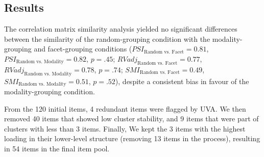 \documentclass[
  man,
  floatsintext,
  longtable,
  nolmodern,
  notxfonts,
  notimes,
  mask,
  colorlinks=true,linkcolor=blue,citecolor=blue,urlcolor=blue]{apa7}
\begin{document}
\subsection{Results}\label{results}

The correlation matrix similarity analysis yielded no significant
differences between the similarity of the random-grouping condition with
the modality-grouping and facet-grouping conditions
(\(PSI_{\text{Random vs. Facet}} = 0.81\),
\(PSI_{\text{Random vs. Modality}} = 0.82\), \(p = .45\);
\(RVadj_{\text{Random vs. Facet}} = 0.77\),
\(RVadj_{\text{Random vs. Modality}} = 0.78\), \(p = .74\);
\(SMI_{\text{Random vs. Facet}} = 0.49\),
\(SMI_{\text{Random vs. Modality}} = 0.51\), \(p = .52\)), despite a
consistent bias in favour of the modality-grouping condition.

From the 120 initial items, 4 redundant items were flagged by UVA. We
then removed 40 items that showed low cluster stability, and 9 items
that were part of clusters with less than 3 items. Finally, We kept the
3 items with the highest loading in their lower-level structure
(removing 13 items in the process), resulting in 54 items in the final
item pool.
\end{document}
